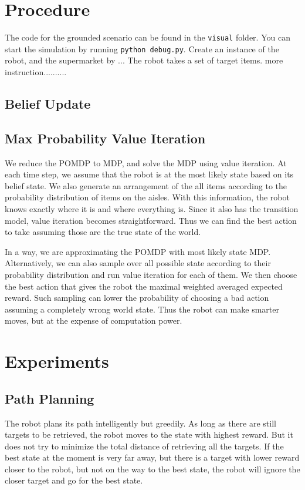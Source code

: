 \documentclass{pset}
\begin{document}
\section{Procedure}
\label{sec:procedure}
The code for the grounded scenario can be found in the \texttt{visual} folder. 
You can start the simulation by running \texttt{python debug.py}. 
Create an instance of the robot, and the supermarket by ...
The robot takes a set of target items. more instruction..........

\subsection{Belief Update}

\subsection{Max Probability Value Iteration}
We reduce the POMDP to MDP, and solve the MDP using value iteration. At each time step, we assume
that the robot is at the most likely state based on its belief state. We also generate an
arrangement of the all items according to the probability distribution of items on the aisles. With
this information, the robot knows exactly where it is and where everything is. Since it also has the
transition model, value iteration becomes straightforward. Thus we can find the best action to take
assuming those are the true state of the world. 

In a way, we are approximating the POMDP with most likely state MDP. Alternatively, we can also
sample over all possible state according to their probability distribution and run value iteration
for each of them. We then choose the best action that gives the robot the maximal weighted averaged
    expected reward. Such sampling can lower the probability of choosing a bad action assuming a
    completely wrong world state. Thus the robot can make smarter moves, but at the expense of
    computation power. 

\section{Experiments}
\label{sec:experiments}

\subsection{Path Planning}
The robot plans its path intelligently but greedily. As long as there are still targets to be
retrieved, the robot moves to the state with highest reward. But it does not try to minimize the
total distance of retrieving all the targets. If the best state at the moment is very far away, but
there is a target with lower reward closer to the robot, but not on the way to the best state, the
robot will ignore the closer target and go for the best state. 
\end{document}
